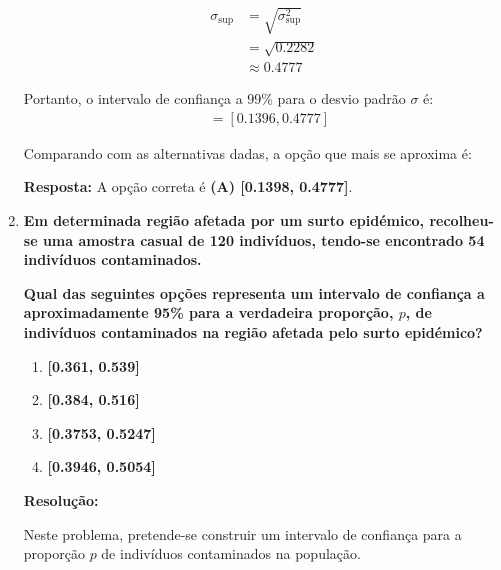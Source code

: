 \documentclass[a4paper,12pt]{article}
\begin{document}
\begin{enumerate}
\begin{mdframed}[backgroundcolor=gray!10, linewidth=0pt, innertopmargin=10pt, innerbottommargin=10pt]
    \begin{align*}
    \sigma_{\text{sup}} &= \sqrt{\sigma^2_{\text{sup}}} \\
    &= \sqrt{0.2282} \\
    &\approx 0.4777
    \end{align*}

    Portanto, o intervalo de confiança a 99\% para o desvio padrão $\sigma$ é:
    \begin{align*}
    [\sigma_{\text{inf}}, \sigma_{\text{sup}}] &= [0.1396, 0.4777]
    \end{align*}

    Comparando com as alternativas dadas, a opção que mais se aproxima é:

    \textbf{Resposta:} A opção correta é \textbf{(A) [0.1398, 0.4777]}.
    \end{mdframed}

    \vspace{0.5cm}

    \item \textbf{Em determinada região afetada por um surto epidémico, recolheu-se uma amostra casual de 120 indivíduos, tendo-se encontrado 54 indivíduos contaminados.}

    \textbf{Qual das seguintes opções representa um intervalo de confiança a aproximadamente 95\% para a verdadeira proporção, \( p \), de indivíduos contaminados na região afetada pelo surto epidémico?}

    \vspace{0.3cm}

    \begin{enumerate}[label=\Alph*)]
        \item \textbf{[0.361, 0.539]}
        \item \textbf{[0.384, 0.516]}
        \item \textbf{[0.3753, 0.5247]}
        \item \textbf{[0.3946, 0.5054]}
    \end{enumerate}

    \vspace{0.3cm}

    \begin{mdframed}[backgroundcolor=gray!10, linewidth=0pt, innertopmargin=10pt, innerbottommargin=10pt]
    \textbf{Resolução:}

    Neste problema, pretende-se construir um intervalo de confiança para a proporção $p$ de indivíduos contaminados na população.


\end{mdframed}
\end{enumerate}
\end{document}
